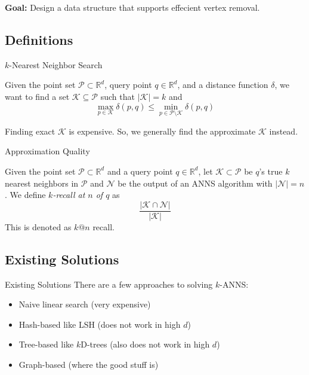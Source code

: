 \begin{frame}
    \textbf{Goal:} Design a data structure that supports effecient vertex removal.
\end{frame}

\subsection{Definitions}

\begin{frame}{\(k\)-Nearest Neighbor Search}
\begin{definition}
    Given the point set \(\mathcal{P} \subset \mathbb{R}^d\), query point \(q \in \mathbb{R}^d\), and a distance function \(\delta\), we want to find a set \(\mathcal{K} \subseteq \mathcal{P}\) such that \(|\mathcal{K}| = k\) and
    \[
        \max_{p \in \mathcal{K}} \delta(p, q) \leq \min_{p \in \mathcal{P} \setminus \mathcal{K}} \delta(p, q)
    \]
    \end{definition}

    Finding exact \(\mathcal{K}\) is expensive. So, we generally find the approximate \(\mathcal{K}\) instead.
\end{frame}

\begin{frame}{Approximation Quality}
\begin{definition}[Recall]
    Given the point set \(\mathcal{P} \subset \mathbb{R}^d\) and a query point \(q \in \mathbb{R}^d\), let \(\mathcal{K} \subset \mathcal{P}\) be \(q\)'s true \(k\) nearest neighbors in \(\mathcal{P}\) and \(\mathcal{N}\) be the output of an ANNS algorithm with \(|\mathcal{N}| = n\). We define \textit{\(k\)-recall at \(n\) of \(q\)} as
    \[
        \frac{|\mathcal{K} \cap \mathcal{N}|}{|\mathcal{K}|}
    \]
    This is denoted as \(k@n\) recall.
\end{definition}
\end{frame}

\subsection{Existing Solutions}

\begin{frame}{Existing Solutions}
    There are a few approaches to solving \(k\)-ANNS:
    \begin{itemize}
        \item Naive linear search (very expensive)
        \item Hash-based like LSH (does not work in high \(d\))
        \item Tree-based like \(k\)D-trees (also does not work in high \(d\))
        \item Graph-based (where the good stuff is)
    \end{itemize}
\end{frame}
